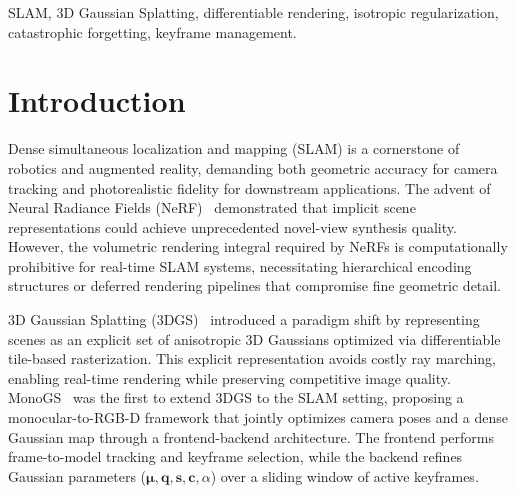 \documentclass[conference]{IEEEtran}
\begin{document}
\begin{IEEEkeywords}
SLAM, 3D Gaussian Splatting, differentiable rendering, isotropic regularization, catastrophic forgetting, keyframe management.
\end{IEEEkeywords}

\section{Introduction}
\label{sec:intro}

Dense simultaneous localization and mapping (SLAM) is a cornerstone of robotics and augmented reality, demanding both geometric accuracy for camera tracking and photorealistic fidelity for downstream applications.
The advent of Neural Radiance Fields (NeRF)~\cite{nerf} demonstrated that implicit scene representations could achieve unprecedented novel-view synthesis quality.
However, the volumetric rendering integral required by NeRFs is computationally prohibitive for real-time SLAM systems, necessitating hierarchical encoding structures or deferred rendering pipelines that compromise fine geometric detail.

3D Gaussian Splatting (3DGS)~\cite{3dgs} introduced a paradigm shift by representing scenes as an explicit set of anisotropic 3D Gaussians optimized via differentiable tile-based rasterization.
This explicit representation avoids costly ray marching, enabling real-time rendering while preserving competitive image quality.
MonoGS~\cite{monogs} was the first to extend 3DGS to the SLAM setting, proposing a monocular-to-RGB-D framework that jointly optimizes camera poses and a dense Gaussian map through a frontend-backend architecture.
The frontend performs frame-to-model tracking and keyframe selection, while the backend refines Gaussian parameters ($\boldsymbol{\mu}, \mathbf{q}, \mathbf{s}, \mathbf{c}, \alpha$) over a sliding window of active keyframes.
\end{document}
